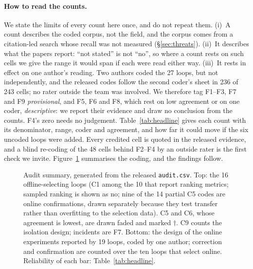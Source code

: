 \documentclass[sigconf,nonacm]{acmart}
\begin{document}
\paragraph{How to read the counts.} We state the limits of every count here once, and do not repeat them.
(i)~A count describes the coded corpus, not the field, and the corpus comes from a citation-led search whose recall was
not measured (\S\ref{sec:threats}). (ii)~It describes what the papers report: ``not stated'' is not ``no'', so where a
count rests on such cells we give the range it would span if each were read either way. (iii)~It rests in effect on
one author's reading. Two authors coded the 27 loops, but not independently, and the released codes follow the second
coder's sheet in 236 of 243 cells; no rater outside the team was involved. We therefore tag F1--F3, F7 and F9
\emph{provisional}, and F5, F6 and F8, which rest on low agreement or on one coder, \emph{descriptive}: we report their
evidence and draw no conclusion from the counts. F4's zero needs no judgement. Table~\ref{tab:headline} gives each
count with its denominator, range, coder and agreement, and how far it could move if the six uncoded loops were added.
Every credited cell is quoted in the released evidence, and a blind re-coding of the 48 cells behind F2--F4 by an
outside rater is the first check we invite. Figure~\ref{fig:auditbars} summarises the coding, and the findings follow.

\begin{figure}[t]
\centering

\caption{Audit summary, generated from the released \texttt{audit.csv}. Top: the 16 offline-selecting loops (C1
among the 10 that report ranking metrics; sampled ranking is shown as no; nine of the 14 partial C5 codes are online
confirmations, drawn separately because they test transfer rather than overfitting to the selection data). C5 and C6,
whose agreement is lowest, are drawn faded and marked $\dagger$. C9 counts the isolation design; incidents are F7.
Bottom: the design of the online experiments reported by 19 loops, coded by one author; correction and confirmation
are counted over the ten loops that select online. Reliability of each bar: Table~\ref{tab:headline}.}
\label{fig:auditbars}
\end{figure}
\end{document}
